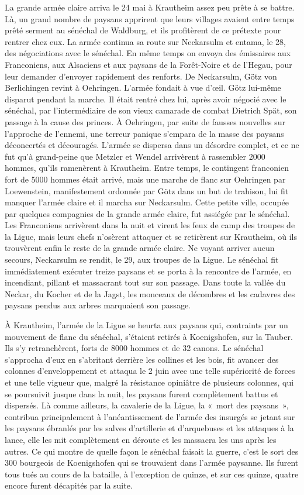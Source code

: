 \documentclass[french,twoside]{book} %
\begin{document}
La grande armée claire arriva le 24 mai à Krautheim assez peu prête à se battre. Là, un grand nombre de paysans apprirent que leurs villages avaient entre temps prêté serment au sénéchal de Waldburg, et ils profitèrent de ce prétexte pour rentrer chez eux. La armée continua sa route sur Neckarsulm et entama, le 28, des négociations avec le sénéchal. En même temps on envoya des émissaires aux Franconiens, aux Alsaciens et aux paysans de la Forêt-Noire et de l’Hegau, pour leur demander d’envoyer rapidement des renforts. De Neckarsulm, Götz von Berlichingen revint à Oehringen. L’armée fondait à vue d’œil. Götz lui-même disparut pendant la marche. Il était rentré chez lui, après avoir négocié avec le sénéchal, par l’intermédiaire de son vieux camarade de combat Dietrich Spät, son passage à la cause des princes. À Oehringen, par suite de fausses nouvelles sur l’approche de l’ennemi, une terreur panique s’empara de la masse des paysans déconcertés et découragés. L’armée se dispersa dans un désordre complet, et ce ne fut qu’à grand-peine que Metzler et Wendel arrivèrent à rassembler 2000 hommes, qu’ils ramenèrent à Krautheim. Entre temps, le contingent franconien fort de 5000 hommes était arrivé, mais une marche de flanc sur Oehringen par Loewenstein, manifestement ordonnée par Götz dans un but de trahison, lui fit manquer l’armée claire et il marcha sur Neckarsulm. Cette petite ville, occupée par quelques compagnies de la grande armée claire, fut assiégée par le sénéchal. Les Franconiens arrivèrent dans la nuit et virent les feux de camp des troupes de la Ligue, mais leurs chefs n’osèrent attaquer et se retirèrent sur Krautheim, où ils trouvèrent enfin le reste de la grande armée claire. Ne voyant arriver aucun secours, Neckarsulm se rendit, le 29, aux troupes de la Ligue. Le sénéchal fit immédiatement exécuter treize paysans et se porta à la rencontre de l’armée, en incendiant, pillant et massacrant tout sur son passage. Dans toute la vallée du Neckar, du Kocher et de la Jagst, les monceaux de décombres et les cadavres des paysans pendus aux arbres marquaient son passage.\par
À Krautheim, l’armée de la Ligue se heurta aux paysans qui, contraints par un mouvement de flanc du sénéchal, s’étaient retirés à Koenigshofen, sur la Tauber. Ils s’y retranchèrent, forts de 8000 hommes et de 32 canons. Le sénéchal s’approcha d’eux en s’abritant derrière les collines et les bois, fit avancer des colonnes d’enveloppement et attaqua le 2 juin avec une telle supériorité de forces et une telle vigueur que, malgré la résistance opiniâtre de plusieurs colonnes, qui se poursuivit jusque dans la nuit, les paysans furent complètement battus et dispersés. Là comme ailleurs, la cavalerie de la Ligue, la « mort des paysans », contribua principalement à l’anéantissement de l’armée des insurgés se jetant sur les paysans ébranlés par les salves d’artillerie et d’arquebuses et les attaques à la lance, elle les mit complètement en déroute et les massacra les uns après les autres. Ce qui montre de quelle façon le sénéchal faisait la guerre, c’est le sort des 300 bourgeois de Koenigshofen qui se trouvaient dans l’armée paysanne. Ils furent tous tués au cours de la bataille, à l’exception de quinze, et sur ces quinze, quatre encore furent décapités par la suite.\par
\end{document}
